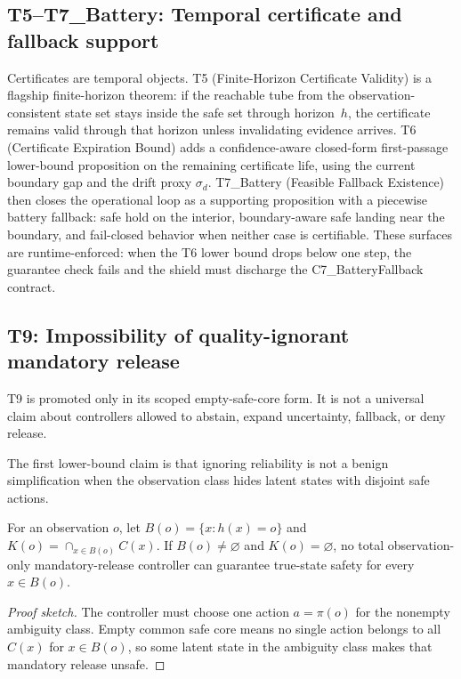 \subsection{T5--T7\_Battery: Temporal certificate and fallback support}
Certificates are temporal objects. T5 (Finite-Horizon Certificate Validity) is a
flagship finite-horizon theorem: if the reachable tube from the
observation-consistent state set stays inside the safe set through horizon~$h$,
the certificate remains valid through that horizon unless invalidating evidence
arrives. T6 (Certificate Expiration Bound) adds a confidence-aware
closed-form first-passage lower-bound proposition on the remaining certificate
life, using the current boundary gap and the drift proxy $\sigma_d$.
T7\_Battery (Feasible Fallback Existence) then closes the operational loop as a
supporting proposition with a piecewise battery fallback: safe hold on the
interior, boundary-aware safe landing near the boundary, and fail-closed behavior
when neither case is certifiable. These surfaces are runtime-enforced:
when the T6 lower bound drops below one step, the guarantee check fails and the shield
must discharge the C7\_BatteryFallback contract.

\subsection{T9: Impossibility of quality-ignorant mandatory release}
T9 is promoted only in its scoped empty-safe-core form.  It is not a universal
claim about controllers allowed to abstain, expand uncertainty, fallback, or deny
release.

The first lower-bound claim is that ignoring reliability is not a benign
simplification when the observation class hides latent states with disjoint safe
actions.

\begin{theorem}
\label{thm:prof-t9}
For an observation \(o\), let \(B(o)=\{x:h(x)=o\}\) and
\(K(o)=\cap_{x\in B(o)}C(x)\). If \(B(o)\ne\varnothing\) and
\(K(o)=\varnothing\), no total observation-only mandatory-release controller
can guarantee true-state safety for every \(x\in B(o)\).
\end{theorem}

\begin{proof}[Proof sketch]
The controller must choose one action \(a=\pi(o)\) for the nonempty ambiguity
class. Empty common safe core means no single action belongs to all \(C(x)\) for
\(x\in B(o)\), so some latent state in the ambiguity class makes that mandatory
release unsafe.
\end{proof}

